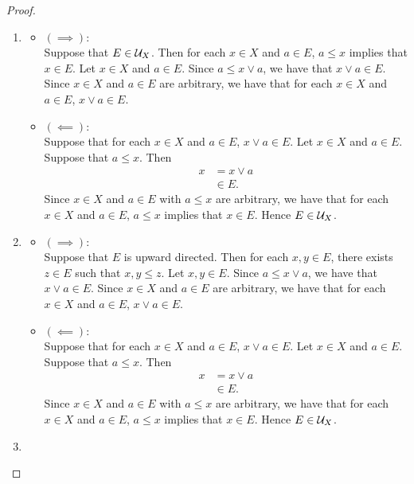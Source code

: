 \documentclass{book}
\begin{document}
	\begin{proof}\
		\begin{enumerate}
			\item 
			\begin{itemize}
				\item $(\implies)$: \\
				Suppose that $E \in \mathcal{U}_X$. Then for each $x \in X$ and $a \in E$, $a \leq x$ implies that $x \in E$. Let $x \in X$ and $a \in E$. Since $a \leq x \vee a$, we have that $x \vee a \in E$. Since $x \in X$ and $a \in E$ are arbitrary, we have that for each $x \in X$ and $a \in E$, $x \vee a \in E$. 
				\item $(\impliedby)$: \\
				Suppose that for each $x \in X$ and $a \in E$, $x \vee a \in E$. Let $x \in X$ and $a \in E$. Suppose that $a \leq x$. Then 
				\begin{align*}
					x 
					& = x \vee a \\
					& \in E.
				\end{align*}
				Since $x \in X$ and $a \in E$ with $a \leq x$ are arbitrary, we have that for each $x \in X$ and $a \in E$, $a \leq x$ implies that $x \in E$. Hence $E \in \mathcal{U}_X$. 
			\end{itemize}
			\item 
			\begin{itemize}
				\item $(\implies)$: \\
				Suppose that $E$ is upward directed. Then for each $x,y \in E$, there exists $z \in E$ such that $x,y \leq z$. Let $x,y \in E$. Since $a \leq x \vee a$, we have that $x \vee a \in E$. Since $x \in X$ and $a \in E$ are arbitrary, we have that for each $x \in X$ and $a \in E$, $x \vee a \in E$. 
				\item $(\impliedby)$: \\
				Suppose that for each $x \in X$ and $a \in E$, $x \vee a \in E$. Let $x \in X$ and $a \in E$. Suppose that $a \leq x$. Then 
				\begin{align*}
					x 
					& = x \vee a \\
					& \in E.
				\end{align*}
				Since $x \in X$ and $a \in E$ with $a \leq x$ are arbitrary, we have that for each $x \in X$ and $a \in E$, $a \leq x$ implies that $x \in E$. Hence $E \in \mathcal{U}_X$. 
			\end{itemize}
			\item {}
		\end{enumerate}
	\end{proof}
	
\end{document}

